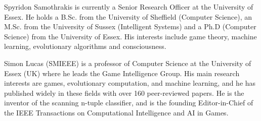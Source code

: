 \documentclass[journal]{IEEEtran}
\begin{document}
\begin{IEEEbiography}{Spyridon Samothrakis}
 is currently a Senior Research Officer at the University of Essex. He holds a B.Sc. from the University of Sheffield (Computer Science), an M.Sc. from the University of Sussex (Intelligent Systems) and a Ph.D (Computer Science) from the University of Essex. His interests include game theory, machine learning, evolutionary algorithms and consciousness.
\end{IEEEbiography}

\begin{IEEEbiography}{Simon Lucas}
(SMIEEE) is a professor of Computer Science at the University of Essex (UK) where he leads the Game Intelligence Group. His main research interests are games, evolutionary computation, and machine learning, and he has published widely in these fields with over 160 peer-reviewed papers. He is the inventor of the scanning n-tuple classifier, and is the founding Editor-in-Chief of the IEEE Transactions on Computational Intelligence and AI in Games.
\end{IEEEbiography}






\end{document}
